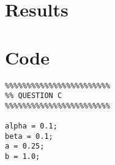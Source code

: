 \documentclass[10pt]{article}
\begin{document}
\begin{description}[wide = 0pt]

\end{description}

\section*{Results}

\section*{Code}

\begin{lstlisting}
%%%%%%%%%%%%%%%%%%%%%%%%
%% QUESTION C
%%%%%%%%%%%%%%%%%%%%%%%%

alpha = 0.1;
beta = 0.1;
a = 0.25;
b = 1.0;
\end{lstlisting}
\end{document}
